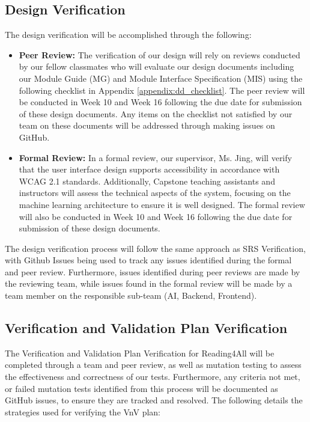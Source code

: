 \documentclass[12pt, titlepage]{article}
\begin{document}
\subsection{Design Verification}
The design verification will be accomplished through the following:
\begin{itemize}
  \item \textbf{Peer Review:} The verification of our design will
    rely on reviews conducted by our fellow classmates who will
    evaluate our design documents including our Module Guide (MG) and
    Module Interface Specification (MIS) using the following
    checklist in Appendix \ref{appendix:dd_checklist}. The peer review will
    be conducted in Week 10 and Week 16 following the due date for
    submission of these design documents.
    Any items on the checklist not satisfied by our team on these
    documents will be addressed through making issues on GitHub.
  \item \textbf{Formal Review:} In a formal review, our supervisor,
    Ms. Jing, will verify that the user interface design supports
    accessibility in accordance with WCAG 2.1 standards.
    Additionally, Capstone teaching assistants and instructors will
    assess the technical aspects of the system, focusing on the
    machine learning architecture to ensure it is well designed.
    The formal review will also be conducted in Week 10 and Week 16
    following the due date for submission of these design documents.
\end{itemize}
The design verification process will follow the same approach as SRS Verification, with Github 
Issues being used to track any issues identified during the formal and peer review. Furthermore, issues identified during peer reviews
are made by the reviewing team, while issues found in the formal review will be made by a team member on the responsible sub-team (AI, Backend, Frontend).

\subsection{Verification and Validation Plan Verification}

The Verification and Validation Plan Verification for Reading4All will be completed through a team and peer review,
as well as mutation testing to assess the effectiveness and correctness of our
tests. Furthermore, any criteria not met, or failed mutation tests identified
from this process will be documented as GitHub issues, to ensure they are
tracked and resolved. The following details the 
strategies used for verifying the VnV plan: 
\end{document}
